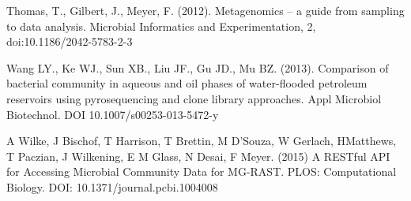 \begin{thebibliography}{99.}
 Thomas, T., Gilbert, J., Meyer, F. (2012). Metagenomics – a guide from sampling to data analysis. Microbial Informatics and Experimentation, 2, doi:10.1186/2042-5783-2-3

Wang LY., Ke WJ., Sun XB., Liu JF., Gu JD., Mu BZ. (2013). Comparison of bacterial community in aqueous and oil phases of water-flooded petroleum reservoirs using pyrosequencing and clone library approaches. Appl Microbiol Biotechnol. DOI 10.1007/s00253-013-5472-y

 A Wilke, J Bischof, T Harrison, T Brettin, M D'Souza, W Gerlach, HMatthews, T Paczian, J Wilkening, E M Glass, N Desai, F Meyer. (2015) A RESTful API for Accessing Microbial Community Data for MG-RAST. PLOS: Computational Biology. DOI: 10.1371/journal.pcbi.1004008
%
%
%
%
%
\end{thebibliography}
